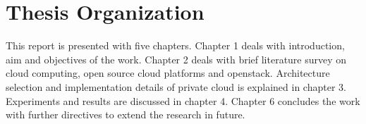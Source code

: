 \section{Thesis Organization}
This report is presented with five chapters. Chapter 1 deals with introduction, aim and objectives of the work. Chapter 2 deals with brief literature survey on cloud computing, open source cloud platforms and openstack. Architecture selection and implementation details of private cloud is explained in chapter 3. Experiments and results are discussed in chapter 4. Chapter 6 concludes the work with further directives to extend the research in future.

\makeatother